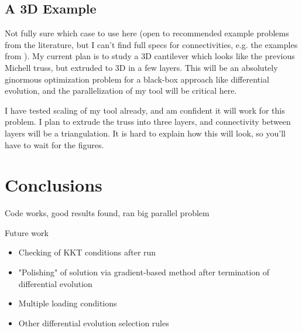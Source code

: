 \documentclass{article}
\begin{document}
\subsection{A 3D Example}

Not fully sure which case to use here (open to recommended example
problems from the literature, but I can't find full specs for connectivities,
e.g. the examples from \cite{pedersenOptimizationPracticalTrusses2003}). My current plan is to study
a 3D cantilever which looks like the previous Michell truss, but
extruded to 3D in a few layers. This will be an absolutely ginormous
optimization problem for a black-box approach like differential evolution, and
the parallelization of my tool will be critical here.

I have tested scaling of my tool already, and am confident it will work for
this problem. I plan to extrude the truss into three layers, and connectivity
between layers will be a triangulation. It is hard to explain how this
will look, so you'll have to wait for the figures.

\section{Conclusions}
Code works, good results found, ran big parallel problem

Future work
\begin{itemize}
  \item Checking of KKT conditions after run
  \item "Polishing" of solution via gradient-based method after termination of differential evolution
  \item Multiple loading conditions
  \item Other differential evolution selection rules
\end{itemize}

\printbibliography
\end{document}
